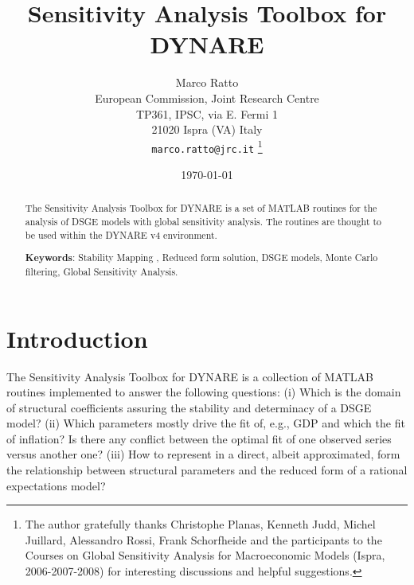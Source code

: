 \documentclass[12pt,a4paper]{article}
\begin{document}
\title{Sensitivity Analysis Toolbox for DYNARE}%

\author{Marco Ratto\\
European Commission, Joint Research Centre \\
TP361, IPSC, via E. Fermi 1\\21020 Ispra
(VA) Italy\\
\texttt{marco.ratto@jrc.it}
\thanks{The author gratefully thanks Christophe Planas, Kenneth Judd, Michel Juillard,
Alessandro Rossi, Frank Schorfheide and the participants to the
Courses on Global Sensitivity Analysis for Macroeconomic
Models (Ispra, 2006-2007-2008) for interesting discussions and
helpful suggestions.}}

\date{\today}
\maketitle %


\begin{abstract}
\noindent The Sensitivity Analysis Toolbox for DYNARE is a set of
MATLAB routines for the analysis of DSGE models with global
sensitivity analysis. The routines are thought to be used within
the DYNARE v4 environment.


\begin{description}
  \item \textbf{Keywords}: Stability Mapping , Reduced form solution, DSGE models,
  Monte Carlo filtering,   Global Sensitivity Analysis.
\end{description}
\end{abstract}
\newpage
\section{Introduction} \label{s:intro}
The Sensitivity Analysis Toolbox for DYNARE is a collection of
MATLAB routines implemented to answer the following questions: (i)
Which is the domain of structural coefficients assuring the
stability and determinacy of a DSGE model? (ii) Which parameters
mostly drive the fit of, e.g., GDP and which the fit of inflation?
Is there any conflict between the optimal fit of one observed
series versus another one? (iii) How to represent in a direct,
albeit approximated, form the relationship between structural
parameters and the reduced form of a rational expectations model?
\end{document}
